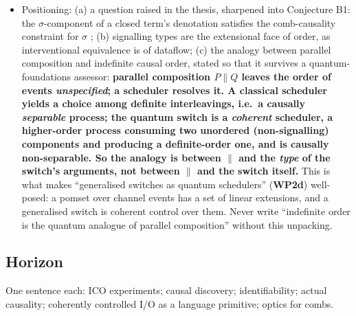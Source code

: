\documentclass[11pt,a4paper]{article}
\newif\ifskeletonnotes
\newcommand{\sknote}[1]{\ifskeletonnotes{\small\color{blue!60!black}\textit{[#1]}}\fi}
\newcommand{\budget}[1]{\ifskeletonnotes{\small\color{red!60!black}\textbf{(\textasciitilde#1 words)}}\fi}
\newcommand{\WP}[1]{\textbf{WP#1}}
\begin{document}
\begin{itemize}[nosep]
\item Positioning: (a) a question raised in the thesis, sharpened into Conjecture B1: the $\sigma$-component of a closed term's denotation satisfies the comb-causality constraint for $\sigma$ \sknote{state precisely which wires are inputs/outputs first}; (b) signalling types are the extensional face of order, as interventional equivalence is of dataflow; (c) the analogy between parallel composition and indefinite causal order, stated so that it survives a quantum-foundations assessor: \textbf{parallel composition $P \parallel Q$ leaves the order of events \emph{unspecified}; a scheduler resolves it. A classical scheduler yields a choice among definite interleavings, i.e.\ a causally \emph{separable} process; the quantum switch is a \emph{coherent} scheduler, a higher-order process consuming two unordered (non-signalling) components and producing a definite-order one, and is causally non-separable. So the analogy is between $\parallel$ and the \emph{type} of the switch's arguments, not between $\parallel$ and the switch itself.} This is what makes ``generalised switches as quantum schedulers'' (\WP{2d}) well-posed: a pomset over channel events has a set of linear extensions, and a generalised switch is coherent control over them. Never write ``indefinite order is the quantum analogue of parallel composition'' without this unpacking.
\end{itemize}
\subsection{Horizon}\budget{80}
One sentence each: ICO experiments; causal discovery; identifiability; actual causality; coherently controlled I/O as a language primitive; optics for combs.
\end{document}
